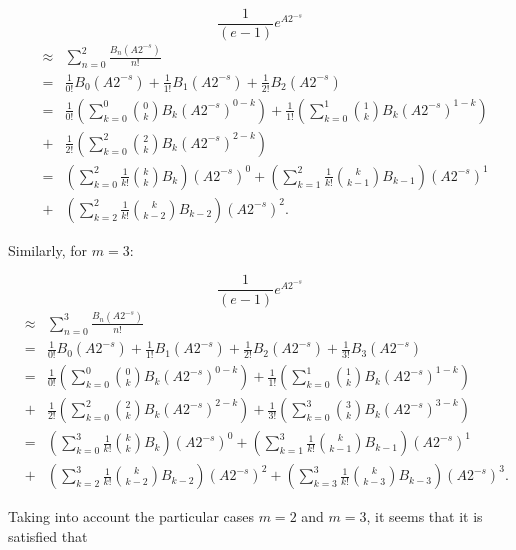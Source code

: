 \documentclass[preprint,10pt]{elsarticle}
\begin{document}
$$
\frac{1}{\left(e-1 \right)}e^{A 2^{-s}}
$$
\begin{eqnarray*}
 & \approx & \sum_{n=0}^2 \frac{B_n\left(A 2^{-s}\right)}{n!} \\
& = & \frac{1}{0!} B_0\left(A 2^{-s}\right) + \frac{1}{1!} B_1\left(A 2^{-s}\right)+ \frac{1}{2!} B_2\left(A 2^{-s}\right) \\
&=& \frac{1}{0!} \left(\sum_{k=0}^{0} {0 \choose k} B_k \left(A 2^{-s}\right)^{0-k} \right) +  \frac{1}{1!} \left(\sum_{k=0}^{1} {1 \choose k} B_k \left(A 2^{-s}\right)^{1-k} \right)\\
&+&  \frac{1}{2!} \left(\sum_{k=0}^{2} {2 \choose k} B_k \left(A 2^{-s}\right)^{2-k} \right) \\
&=& \left(\sum_{k=0}^{2} \frac{1}{k!} {k \choose k} B_k \right) \left(A 2^{-s}\right)^0 + \left(\sum_{k=1}^{2} \frac{1}{k!} {k \choose k-1} B_{k-1} \right) \left(A 2^{-s}\right)^1\\
&+& \left(\sum_{k=2}^{2} \frac{1}{k!} {k \choose k-2} B_{k-2} \right) \left(A 2^{-s}\right)^2.
\end{eqnarray*}

Similarly, for $m=3$:

$$
\frac{1}{\left(e-1 \right)}e^{A 2^{-s}}
$$
\begin{eqnarray*}
& \approx & \sum_{n=0}^3 \frac{B_n\left(A 2^{-s}\right)}{n!} \\
& = & \frac{1}{0!} B_0\left(A 2^{-s}\right) + \frac{1}{1!} B_1\left(A 2^{-s}\right)+ \frac{1}{2!} B_2\left(A 2^{-s}\right)+\frac{1}{3!} B_3\left(A 2^{-s}\right) \\
&=& \frac{1}{0!} \left(\sum_{k=0}^{0} {0 \choose k} B_k \left(A 2^{-s}\right)^{0-k} \right) +  \frac{1}{1!} \left(\sum_{k=0}^{1} {1 \choose k} B_k \left(A 2^{-s}\right)^{1-k} \right)\\
&+&  \frac{1}{2!} \left(\sum_{k=0}^{2} {2 \choose k} B_k \left(A 2^{-s}\right)^{2-k} \right) +  \frac{1}{3!} \left(\sum_{k=0}^{3} {3 \choose k} B_k \left(A 2^{-s}\right)^{3-k} \right)  \\
&=& \left(\sum_{k=0}^{3} \frac{1}{k!} {k \choose k} B_k \right) \left(A 2^{-s}\right)^0 + \left(\sum_{k=1}^{3} \frac{1}{k!} {k \choose k-1} B_{k-1} \right) \left(A 2^{-s}\right)^1 \\
&+& \left(\sum_{k=2}^{3} \frac{1}{k!} {k \choose k-2} B_{k-2} \right) \left(A 2^{-s}\right)^2+\left(\sum_{k=3}^{3} \frac{1}{k!} {k \choose k-3} B_{k-3} \right) \left(A 2^{-s}\right)^3.
\end{eqnarray*}

Taking into account the particular cases $m=2$ and $m=3$, it seems that it is satisfied that
\end{document}
